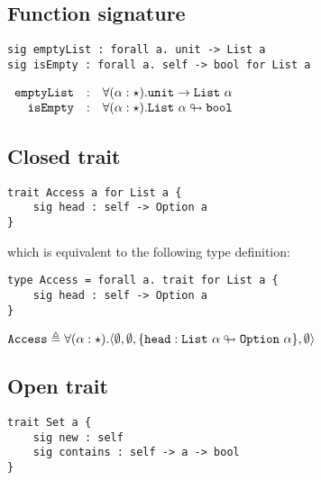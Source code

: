 \documentclass{article}[11pt]
\newcommand{\term}[1]{\verb~#1~}
\begin{document}
    \subsection{Function signature}\label{subsec:function-signature}

    \begin{verbatim}
sig emptyList : forall a. unit -> List a
sig isEmpty : forall a. self -> bool for List a
    \end{verbatim}

    \noindent
    \begin{math}
        \begin{array}{rclp{5cm}}
            \term{emptyList} & : & \forall(\alpha:\star).\term{unit} \rightarrow \term{List}~\alpha     \\
            \term{isEmpty}   & : & \forall(\alpha:\star).\term{List}~\alpha \looparrowright \term{bool}
        \end{array}
    \end{math}

    \subsection{Closed trait}\label{subsec:closed-trait}

    \begin{verbatim}
trait Access a for List a {
    sig head : self -> Option a
}
    \end{verbatim}

    which is equivalent to the following type definition:

    \begin{verbatim}
type Access = forall a. trait for List a {
    sig head : self -> Option a
}
    \end{verbatim}

    \noindent
    \begin{math}
        \term{Access} \triangleq \forall(\alpha:\star).\langle
        \emptyset,
        \emptyset,
        \{ \term{head} : \term{List}~\alpha \looparrowright \term{Option}~\alpha \},
        \emptyset
        \rangle
    \end{math}

    \subsection{Open trait}

    \begin{verbatim}
trait Set a {
    sig new : self
    sig contains : self -> a -> bool
}
    \end{verbatim}
\end{document}
